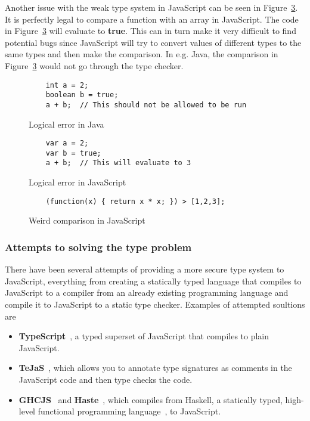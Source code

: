 Another issue with the weak type system in JavaScript can be seen in Figure~\ref{fig:js_comparison}. It is perfectly legal to compare a function with an array in JavaScript. The code in Figure~\ref{fig:js_comparison} will evaluate to \textbf{true}. This can in turn make it very difficult to find potential bugs since JavaScript will try to convert values of different types to the same types and then make the comparison. In e.g. Java, the comparison in Figure~\ref{fig:js_comparison} would not go through the type checker.
\begin{figure}[h]
  \begin{verbatim}
    int a = 2;
    boolean b = true;
    a + b;  // This should not be allowed to be run
  \end{verbatim}
  \caption{Logical error in Java}
  \label{fig:error_java}
\end{figure}
\begin{figure}[h]
  \begin{verbatim}
    var a = 2;
    var b = true;
    a + b;  // This will evaluate to 3
  \end{verbatim}
  \caption{Logical error in JavaScript}
  \label{fig:error_js}
\end{figure}
\begin{figure}[h]
  \begin{verbatim}
    (function(x) { return x * x; }) > [1,2,3];
  \end{verbatim}
  \caption{Weird comparison in JavaScript}
  \label{fig:js_comparison}
\end{figure}

\subsubsection{Attempts to solving the type problem}
There have been several attempts of providing a more secure type system to JavaScript, everything from creating a statically typed language that compiles to JavaScript to a compiler from an already existing programming language and compile it to JavaScript to a static type checker. Examples of attempted soultions are
\begin{itemize}
  \item \textbf{TypeScript}~\cite{typescript}, a typed superset of JavaScript that compiles to plain JavaScript.
  \item \textbf{TeJaS}~\cite{tejas-art,tejas-git}, which allows you to annotate type signatures as comments in the JavaScript code and then type checks the code.
  \item \textbf{GHCJS}~\cite{ghcjs} and \textbf{Haste}~\cite{haste-lang,haste-symposium}, which compiles from Haskell, a statically typed, high-level functional programming language~\cite{haskell}, to JavaScript.
\end{itemize}


